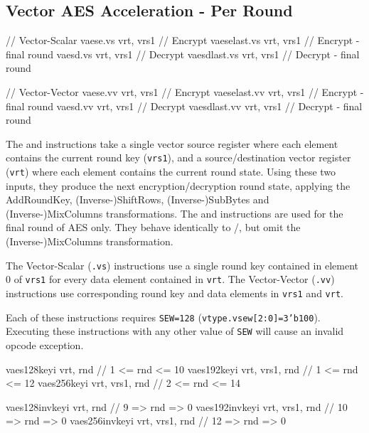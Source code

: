 
\subsection{Vector AES Acceleration - Per Round}
\label{sec:vector:aes:single-round}

\begin{cryptoisa}
// Vector-Scalar
vaese.vs        vrt, vrs1        // Encrypt
vaeselast.vs    vrt, vrs1        // Encrypt - final round
vaesd.vs        vrt, vrs1        // Decrypt
vaesdlast.vs    vrt, vrs1        // Decrypt - final round

// Vector-Vector
vaese.vv        vrt, vrs1        // Encrypt
vaeselast.vv    vrt, vrs1        // Encrypt - final round
vaesd.vv        vrt, vrs1        // Decrypt
vaesdlast.vv    vrt, vrs1        // Decrypt - final round
\end{cryptoisa}

The  and  instructions take
a single vector source register where each element contains the
current round key ({\tt vrs1}),
and
a source/destination vector register ({\tt vrt}) where each element contains
the current round state.
Using these two inputs, they produce the next encryption/decryption
round state, applying the 
AddRoundKey, (Inverse-)ShiftRows, (Inverse-)SubBytes and (Inverse-)MixColumns
transformations.
The  and  instructions
are used for the final round of AES only.
They behave identically to /, but
omit the (Inverse-)MixColumns transformation.

The Vector-Scalar ({\tt *.vs}) instructions use a single round key
contained in element $0$ of {\tt vrs1} for every data element
contained in {\tt vrt}.
The Vector-Vector ({\tt *.vv}) instructions use corresponding
round key and data elements in {\tt vrs1} and {\tt vrt}.

Each of these instructions requires {\tt SEW=128}
({\tt vtype.vsew[2:0]=3'b100}).
Executing these instructions with any other value of {\tt SEW} will cause
an invalid opcode exception.


\begin{cryptoisa}
vaes128keyi     vrt,       rnd    // 1  <= rnd <= 10
vaes192keyi     vrt, vrs1, rnd    // 1  <= rnd <= 12
vaes256keyi     vrt, vrs1, rnd    // 2  <= rnd <= 14

vaes128invkeyi  vrt,       rnd    // 9  => rnd =>  0
vaes192invkeyi  vrt, vrs1, rnd    // 10 => rnd =>  0
vaes256invkeyi  vrt, vrs1, rnd    // 12 => rnd =>  0
\end{cryptoisa}

